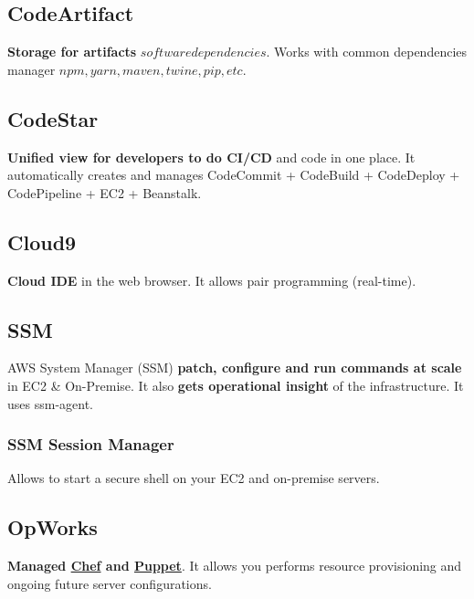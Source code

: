 \subsection{CodeArtifact}\label{subsec:codeartifact}
\textbf{Storage for artifacts} \(software dependencies\)\@.
Works with common dependencies manager \(npm, yarn, maven, twine, pip, etc\)\@.

\subsection{CodeStar}\label{subsec:codestar}
\textbf{Unified view for developers to do CI/CD} and code in one place.
It automatically creates and manages CodeCommit + CodeBuild + CodeDeploy + CodePipeline + EC2 + Beanstalk.

\subsection{Cloud9}\label{subsec:cloud9}
\textbf{Cloud IDE} in the web browser.
It allows pair programming (real-time).

\subsection{SSM}\label{subsec:ssm}
AWS System Manager (SSM) \textbf{patch, configure and run commands at scale} in EC2 \& On-Premise.
It also \textbf{gets operational insight} of the infrastructure.
It uses ssm-agent.

\subsubsection{SSM Session Manager}
Allows to start a secure shell on your EC2 and on-premise servers.

\subsection{OpWorks}\label{subsec:opworks}
\textbf{Managed \href{https://www.chef.io/}{Chef} and \href{https://www.puppet.com/}{Puppet}}.
It allows you performs resource provisioning and ongoing future server configurations.
